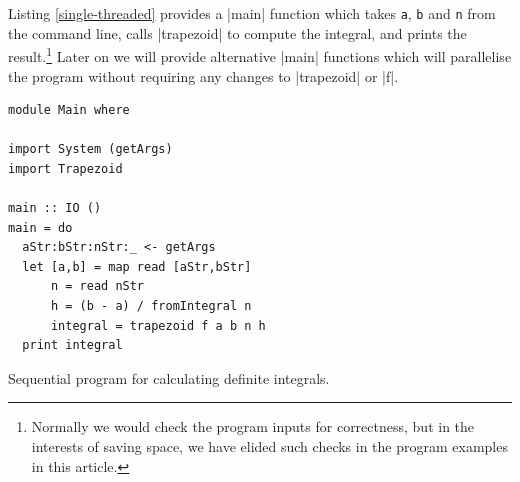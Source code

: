 \documentclass{tmr}
\begin{document}
\noindent
Listing \ref{single-threaded} provides a |main| function which takes
\verb|a|, \verb|b| and \verb|n| from the command line, calls |trapezoid| to compute the integral, and prints
the result.\footnote{Normally we would check the program inputs for correctness, but in
the interests of saving space, we have elided such checks in the program examples in this article.}
Later on we will provide alternative |main| functions which will parallelise the program
without requiring any changes to |trapezoid| or |f|.

\begin{listing}
\begin{Verbatim}
module Main where

import System (getArgs)
import Trapezoid

main :: IO ()
main = do
  aStr:bStr:nStr:_ <- getArgs
  let [a,b] = map read [aStr,bStr]
      n = read nStr
      h = (b - a) / fromIntegral n
      integral = trapezoid f a b n h
  print integral 
\end{Verbatim}
\caption{Sequential program for calculating definite integrals. \label{single-threaded}}
\end{listing}


%


\end{document}
